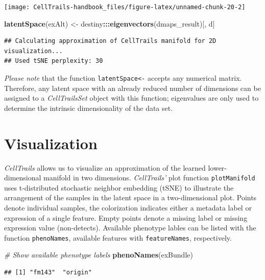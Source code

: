\documentclass[]{book}
\newenvironment{Shaded}{\begin{snugshade}}{\end{snugshade}}
\newcommand{\KeywordTok}[1]{\textcolor[rgb]{0.13,0.29,0.53}{\textbf{#1}}}
\newcommand{\StringTok}[1]{\textcolor[rgb]{0.31,0.60,0.02}{#1}}
\newcommand{\CommentTok}[1]{\textcolor[rgb]{0.56,0.35,0.01}{\textit{#1}}}
\newcommand{\OperatorTok}[1]{\textcolor[rgb]{0.81,0.36,0.00}{\textbf{#1}}}
\newcommand{\NormalTok}[1]{#1}
\theoremstyle{definition}
\theoremstyle{definition}
\theoremstyle{definition}
\theoremstyle{remark}
\begin{document}
\texttt{[image: CellTrails-handbook\_files/figure-latex/unnamed-chunk-20-2]}

\begin{Shaded}
\begin{Highlighting}[]
\KeywordTok{latentSpace}\NormalTok{(exAlt) <-}\StringTok{ }\NormalTok{destiny}\OperatorTok{:::}\KeywordTok{eigenvectors}\NormalTok{(dmaps_result)[, d]}
\end{Highlighting}
\end{Shaded}

\begin{verbatim}
## Calculating approximation of CellTrails manifold for 2D visualization...
## Used tSNE perplexity: 30
\end{verbatim}

\emph{Please note} that the function \texttt{latentSpace\textless{}-}
accepts any numerical matrix. Therefore, any latent space with an
already reduced number of dimensions can be assigned to a
\emph{CellTrailsSet} object with this function; eigenvalues are only
used to determine the intrinsic dimensionality of the data set.

\section{Visualization}\label{visualization}

\emph{CellTrails} allows us to visualize an approximation of the learned
lower-dimensional manifold in two dimensions. \emph{CellTrails'} plot
function \texttt{plotManifold} uses t-distributed stochastic neighbor
embedding (tSNE) \citep{vdmaaten2008} to illustrate the arrangement of
the samples in the latent space in a two-dimensional plot. Points denote
individual samples, the colorization indicates either a metadata label
or expression of a single feature. Empty points denote a missing label
or missing expression value (non-detects). Available phenotype lables
can be listed with the function \texttt{phenoNames}, available features
with \texttt{featureNames}, respectively.

\begin{Shaded}
\begin{Highlighting}[]
\CommentTok{# Show available phenotype labels}
\KeywordTok{phenoNames}\NormalTok{(exBundle)}
\end{Highlighting}
\end{Shaded}

\begin{verbatim}
## [1] "fm143"  "origin"
\end{verbatim}
\end{document}
